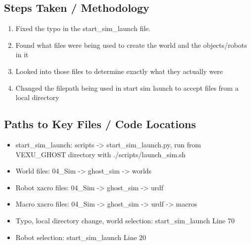 \subsection{Steps Taken / Methodology}
\begin{enumerate}
    \item Fixed the typo in the start\_sim\_launch file.
    \item Found what files were being used to create the world and the objects/robots in it
    \item Looked into those files to determine exactly what they actually were
    \item Changed the filepath being used in start sim launch to accept files from a local directory
\end{enumerate}

\subsection{Paths to Key Files / Code Locations}
\begin{itemize}
    \item start\_sim\_launch: scripts -> start\_sim\_launch.py, run from VEXU\_GHOST directory with ./scripts/launch\_sim.sh
    \item World files: 04\_Sim -> ghost\_sim -> worlds
    \item Robot xacro files: 04\_Sim -> ghost\_sim -> urdf
    \item Macro xacro files: 04\_Sim -> ghost\_sim -> urdf -> macros
    \item Typo, local directory change, world selection: start\_sim\_launch Line 70
    \item Robot selection: start\_sim\_launch Line 20
\end{itemize}

